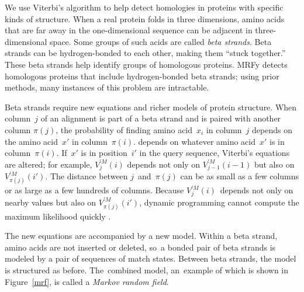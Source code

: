 \documentclass[preprint,nonatbib,blockstyle,times]{sigplanconf}
\newcommand\pairedwith[1]{{\pi(#1)}}
\newcommand\figref[1]{Figure~\ref{#1}}
\newcommand\seclabel[1]{\label{sec:#1}}
\let\cite\citep
\begin{document}
\seclabel{hofs}
\seclabel{mrfy}

We use Viterbi's algorithm to help detect
homologies in proteins with specific kinds of structure.
When a real protein folds in three dimensions, 
amino acids 
that are far away in the one-dimensional sequence can be
adjacent in three-dimensional space.
Some groups of such acids are called \emph{beta strands}.
Beta strands
can be hydrogen-bonded to each other,
making them ``stuck together.''
These beta strands help identify groups of homologous
proteins.
MRFy detects homologous proteins that include hydrogen-bonded beta
strands; using prior methods, many instances of this problem are
intractable. 

Beta strands require new equations and
richer models of protein structure.
When column~$j$ of an alignment is part of a beta strand and is paired
with another column  $\pairedwith j$,
the probability of finding amino acid~$x_i$ in column~$j$ 
\ifpagetuning
depends on the amino acid~$x'$ in column~${\pairedwith i}$.
\else
depends on whatever amino acid~$x'$  is in column~${\pairedwith i}$.
\fi
If~$x'$ is in position~$i'$ in the query sequence, Viterbi's
equations are altered; for example,
$V_{j}^{\prime M}(i)$ depends not only on
$V_{j-1}^{\prime M}(i-1)$ but also on
$V_{\pairedwith j}^{\prime M}(i')$.
The distance between $j$~and~$\pairedwith j$ can be as small as a few
columns or as large as a few hundreds of columns.
Because $V_j^{\prime M}(i)$~depends not only on nearby values but also on
$V_{\pairedwith j}^{\prime M}(i')$,
dynamic programming cannot compute the maximum likelihood quickly 
\cite{Menke:2010ti,Daniels:2012}.

The new equations are accompanied by a new model.
Within a beta strand, amino acids are not inserted or deleted, so~a
bonded pair of beta strands is modeled by 
 a pair of sequences of match states.
Between beta strands, the model is structured as before.
The~combined model, an~example of which is shown in \figref{mrf}, is called a
\textit{Markov random field}. 
\end{document}
